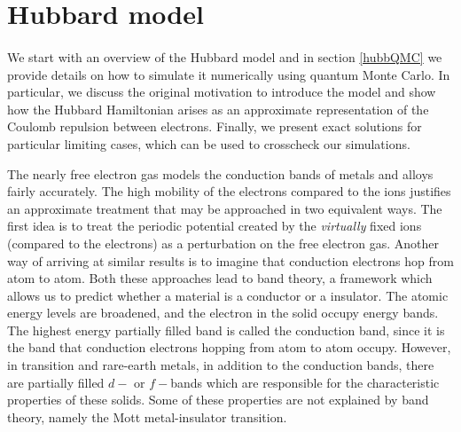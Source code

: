 \documentclass[10pt, twocolumn, twoside]{article}
\begin{document}
\section{Hubbard model}\paragraph{}

We start with an overview of the Hubbard model and in section \ref{hubbQMC} we provide details on how to simulate it numerically using quantum Monte Carlo. In particular, we discuss the original motivation to introduce the model and show how the Hubbard Hamiltonian arises as an approximate representation of the Coulomb repulsion between electrons. Finally, we present exact solutions for particular limiting cases, which can be used to crosscheck our simulations.

The nearly free electron gas models the conduction bands of metals and alloys fairly accurately. The high mobility of the electrons compared to the ions justifies an approximate treatment that may be approached in two equivalent ways. The first idea is to treat the periodic potential created by the \emph{virtually} fixed ions (compared to the electrons) as a perturbation on the free electron gas. Another way of arriving at similar results is to imagine that conduction electrons hop from atom to atom. Both these approaches lead to band theory, a framework which allows us to predict whether a material is a conductor or a insulator. The atomic energy levels are broadened, and the electron in the solid occupy energy bands. The highest energy partially filled band is called the conduction band, since it is the band that conduction electrons hopping from atom to atom occupy. However, in transition and rare-earth metals, in addition to the conduction bands, there are partially filled $d-$ or $f-$bands which are responsible for the characteristic properties of these solids. Some of these properties are not explained by band theory, namely the Mott metal-insulator transition.
\end{document}

